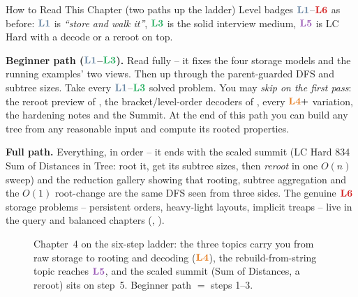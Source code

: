 \begin{chaptertheorybox}{How to Read This Chapter (two paths up the ladder)}
Level badges $\lv1$--$\lv6$ as before: $\lv1$ is \emph{``store and walk it''}, $\lv3$
is the solid interview medium, $\lv5$ is LC Hard with a decode or a reroot on top.

\textbf{Beginner path ($\lv1$--$\lv3$).} Read  fully -- it fixes the
four storage models and the running examples' two views. Then
 up through the parent-guarded DFS and subtree sizes. Take every
$\lv1$--$\lv3$ solved problem. You may \emph{skip on the first pass}: the reroot preview
of , the bracket/level-order decoders of , every
$\lv4{+}$ variation, the hardening notes and the Summit. At the end of this path you
can build any tree from any reasonable input and compute its rooted properties.

\textbf{Full path.} Everything, in order -- it ends with the scaled summit (LC Hard 834
Sum of Distances in Tree: root it, get its subtree sizes, then \emph{reroot} in one
$O(n)$ sweep) and the reduction gallery showing that rooting, subtree aggregation and
the $O(1)$ root-change are the same DFS seen from three sides. The genuine $\lv6$
storage problems -- persistent orders, heavy-light layouts, implicit treaps -- live in
the query and balanced chapters (, ).
\end{chaptertheorybox}

\begin{figure}[H]
\centering
{}
\caption*{Chapter~4 on the six-step ladder: the three topics carry you from raw storage
to rooting and decoding ($\lv4$), the rebuild-from-string topic reaches $\lv5$, and the
scaled summit (Sum of Distances, a reroot) sits on step~5. Beginner path $=$ steps 1--3.}
\end{figure}


